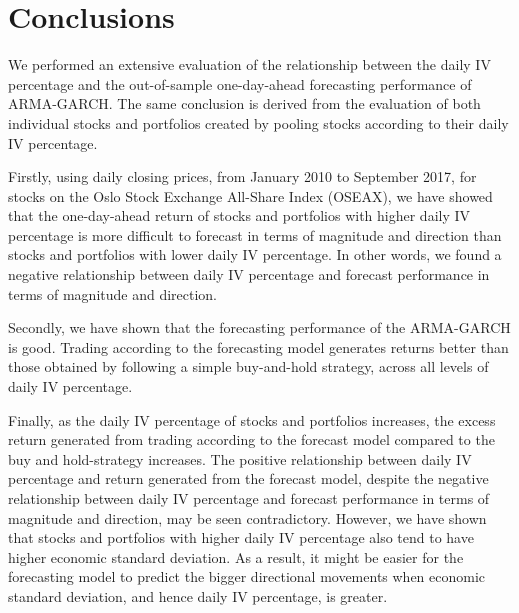 
\chapter{Conclusions}

We performed an extensive evaluation of the relationship between the daily IV percentage and the out-of-sample one-day-ahead forecasting performance of ARMA-GARCH. The same conclusion is derived from the evaluation of both individual stocks and portfolios created by pooling stocks according to their daily IV percentage. 

Firstly, using daily closing prices, from January 2010 to September 2017, for stocks on the Oslo Stock Exchange All-Share Index (OSEAX), we have showed that the one-day-ahead return of stocks and portfolios with higher daily IV percentage is more difficult to forecast in terms of magnitude and direction than stocks and portfolios with lower daily IV percentage. In other words, we found a negative relationship between daily IV percentage and forecast performance in terms of magnitude and direction. 

Secondly, we have shown that the forecasting performance of the ARMA-GARCH is good. Trading according to the forecasting model generates returns better than those obtained by following a simple buy-and-hold strategy, across all levels of daily IV percentage. 

Finally, as the  daily IV percentage of stocks and portfolios increases, the excess return generated from trading according to the forecast model compared to the buy and hold-strategy increases. The positive relationship between daily IV percentage and return generated from the forecast model, despite the negative relationship between daily IV percentage and forecast performance in terms of magnitude and direction, may be seen contradictory. However, we have shown that stocks and portfolios with higher daily IV percentage also tend to have higher economic standard deviation. As a result, it might be easier for the forecasting model to predict the bigger directional movements when economic standard deviation, and hence daily IV percentage, is greater. 